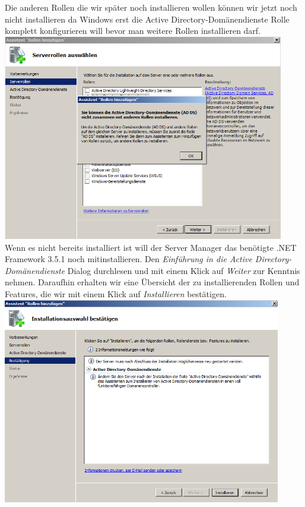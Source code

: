 \documentclass[12pt,a4paper,titlepage]{scrartcl} %
\begin{document}
Die anderen Rollen die wir später noch installieren wollen können wir jetzt noch nicht installieren da Windows erst die Active Directory-Domänendienste Rolle komplett konfigurieren will bevor man weitere Rollen installieren darf.\\
 
 	\includegraphics[height=9cm]{Bilder/009}\\
 	
Wenn es nicht bereits installiert ist will der Server Manager das benötigte .NET Framework 3.5.1 noch mitinstallieren. Den \emph{Einführung in die Active Directory-Domänendienste} Dialog durchlesen und mit einem Klick auf \emph{Weiter} zur Kenntnis nehmen. Daraufhin erhalten wir eine Übersicht der zu installierenden Rollen und Features, die wir mit einem Klick auf \emph{Installieren} bestätigen.\\

 	\includegraphics[height=9cm]{Bilder/011}\\
 
\end{document}
